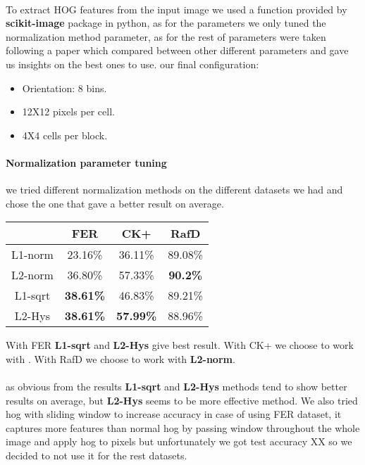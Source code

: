 \paragraph{}
To extract HOG features from the input image we used a function provided by \textbf{scikit-image} package in python, as for the parameters we only tuned the normalization method parameter, as for the rest of parameters were taken following a paper\cite{hog} which compared between other different parameters and gave us insights on the best ones to use.\newline 
our final configuration: \newline
\begin{itemize}
\item Orientation: 8 bins. 
\item 12X12 pixels per cell. 
\item 4X4 cells per block.
\end{itemize}

\paragraph{Normalization parameter tuning}
we tried different normalization methods on the different datasets we had and chose the one that gave a better result on average.

\begin{center}
\begin{tabular}{ c|c|c|c }
	  & FER & CK+ & RafD \\ \hline
	 L1-norm & 23.16\% & 36.11\% & 89.08\% \\  
	 L2-norm & 36.80\% & 57.33\% & \textbf{90.2\%} \\
	 L1-sqrt & \textbf{38.61\%} & 46.83\% & 89.21\% \\
	 L2-Hys & \textbf{38.61\%} & \textbf{57.99\%} & 88.96\% \\
\end{tabular}
\end{center}
With FER \textbf{L1-sqrt} and \textbf{L2-Hys} give best result.\newline
With CK+ we choose to work with  .\newline
With RafD we choose to work with  \textbf{L2-norm}. \newline
\paragraph{}
as obvious from the results \textbf{L1-sqrt} and \textbf{L2-Hys} methods tend to show better results on average, but \textbf{L2-Hys} seems to be more effective method.
\newline \newline We also tried hog with sliding window to increase accuracy in case of using FER dataset, it captures more features than normal hog by passing window throughout the whole image and apply hog to pixels but unfortunately we got test accuracy XX so we decided to not use it for the rest datasets.


